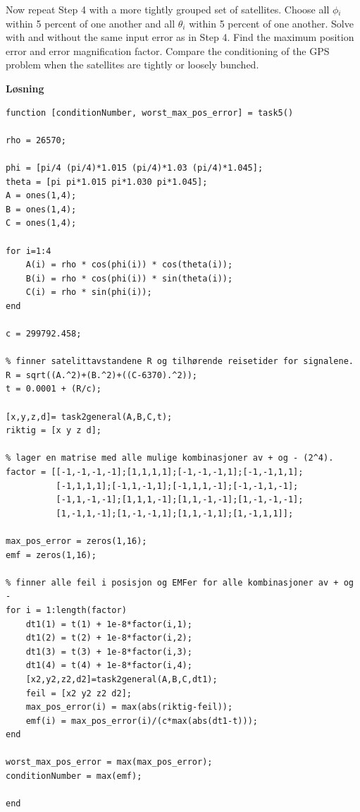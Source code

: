 % 

Now repeat Step 4 with a more tightly grouped set of satellites. Choose all $\phi$$_i$ within
5 percent of one another and all $\theta$$_i$ within 5 percent of one another. Solve with and without the same input error as in Step 4. Find the maximum position error and error magnification factor. Compare the conditioning of the GPS problem when the satellites are tightly or loosely bunched.

\vspace{5mm}

\textbf{Løsning}

\begin{lstlisting}[caption={Task3.m}]
function [conditionNumber, worst_max_pos_error] = task5()

rho = 26570;

phi = [pi/4 (pi/4)*1.015 (pi/4)*1.03 (pi/4)*1.045];
theta = [pi pi*1.015 pi*1.030 pi*1.045];
A = ones(1,4); 
B = ones(1,4); 
C = ones(1,4);

for i=1:4
    A(i) = rho * cos(phi(i)) * cos(theta(i));
    B(i) = rho * cos(phi(i)) * sin(theta(i));
    C(i) = rho * sin(phi(i));
end

c = 299792.458;

% finner satelittavstandene R og tilhørende reisetider for signalene.
R = sqrt((A.^2)+(B.^2)+((C-6370).^2));
t = 0.0001 + (R/c);

[x,y,z,d]= task2general(A,B,C,t); 
riktig = [x y z d];

% lager en matrise med alle mulige kombinasjoner av + og - (2^4).
factor = [[-1,-1,-1,-1];[1,1,1,1];[-1,-1,-1,1];[-1,-1,1,1];
		  [-1,1,1,1];[-1,1,-1,1];[-1,1,1,-1];[-1,-1,1,-1];
		  [-1,1,-1,-1];[1,1,1,-1];[1,1,-1,-1];[1,-1,-1,-1];
		  [1,-1,1,-1];[1,-1,-1,1];[1,1,-1,1];[1,-1,1,1]];

max_pos_error = zeros(1,16);
emf = zeros(1,16);

% finner alle feil i posisjon og EMFer for alle kombinasjoner av + og -
for i = 1:length(factor)
    dt1(1) = t(1) + 1e-8*factor(i,1);
    dt1(2) = t(2) + 1e-8*factor(i,2);
    dt1(3) = t(3) + 1e-8*factor(i,3);
    dt1(4) = t(4) + 1e-8*factor(i,4); 
    [x2,y2,z2,d2]=task2general(A,B,C,dt1);
    feil = [x2 y2 z2 d2];
    max_pos_error(i) = max(abs(riktig-feil));
    emf(i) = max_pos_error(i)/(c*max(abs(dt1-t)));
end

worst_max_pos_error = max(max_pos_error);
conditionNumber = max(emf);

end
\end{lstlisting}

